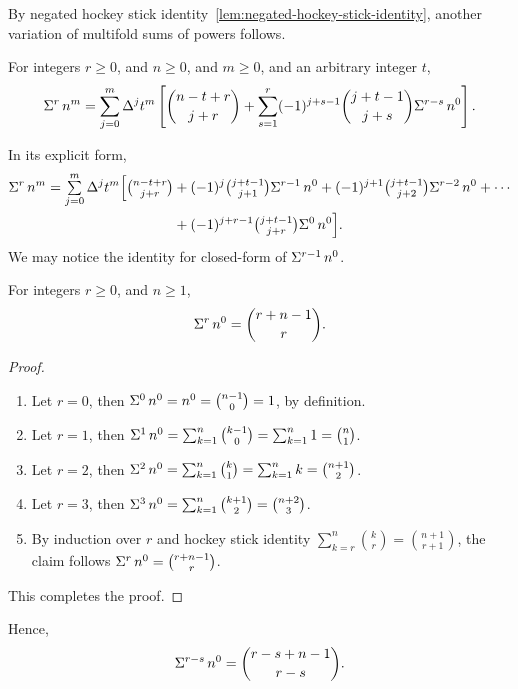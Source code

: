 By negated hockey stick
identity~\eqref{lem:negated-hockey-stick-identity}, another
variation of multifold sums of powers follows.
\begin{theorem}
  \label{theorem:negated-multifold-sums-of-powers-via-newtons-formula}
  For integers $r\geq 0$, and $n\geq 0$, and $m\geq 0$,
  and an arbitrary integer $t$,
  \begin{align*}
    \Sigma^{r}\,{n}^{m}
    = \sum_{j=0}^{m} \Delta^{j} t^{m}
    \left[
      \binom{n-t+r}{j+r}
      + \sum_{s=1}^{r} (-1)^{j+s-1} \binom{j+t-1}{j+s} \Sigma^{r-s}\,{n}^{0}
    \right].
  \end{align*}
\end{theorem}
In its explicit form,
\begin{align*}
  \Sigma^{r}\,{n}^{m} = \mathop{\textstyle\sum}_{j=0}^{m} \Delta^{j} t^{m}
  \Big[
    \tbinom{n-t+r}{j+r}
    &+ (-1)^{j}   \tbinom{j+t-1}{j+1} \Sigma^{r-1}\,{n}^{0}
    + (-1)^{j+1} \tbinom{j+t-1}{j+2} \Sigma^{r-2}\,{n}^{0} + \cdots \\
    &+ (-1)^{j+r-1} \tbinom{j+t-1}{j+r} \Sigma^{0}\,{n}^{0}
  \Big].
\end{align*}
We may notice the identity for closed-form of
$\Sigma^{r-1}\,{n}^{0}$.

\begin{proposition}
  \label{prop:multifold-sum-of-zero-powers}
  For integers $r \geq 0$, and $n\geq 1$,
  \begin{align*}
    \Sigma^{r}\,{n}^{0} = \binom{r+n-1}{r}.
  \end{align*}
  \begin{proof}
    \begin{enumerate}
      \item Let $r=0$, then $\Sigma^{0}\,{n}^{0}=n^0=\binom{n-1}{0} = 1$,
        by definition.
      \item Let $r=1$, then
        $\Sigma^{1}\,{n}^{0}
        = \sum_{k=1}^{n} \binom{k-1}{0}
        = \sum_{k=1}^{n} 1 = \binom{n}{1}$.
      \item Let $r=2$, then
        $\Sigma^{2}\,{n}^{0}= \sum_{k=1}^{n} \binom{k}{1}
        = \sum_{k=1}^{n} k = \binom{n+1}{2}$.
      \item Let $r=3$, then
        $\Sigma^{3}\,{n}^{0}
        = \sum_{k=1}^{n} \binom{k+1}{2}
        = \binom{n+2}{3}$.
      \item By induction over $r$ and hockey stick identity
        $\sum_{k=r}^{n} \binom{k}{r} = \binom{n+1}{r+1}$,
        the claim follows
        $\Sigma^{r}\,{n}^{0} = \binom{r+n-1}{r}$.
    \end{enumerate}
    This completes the proof.
  \end{proof}
\end{proposition}
Hence,
\begin{align*}
  \Sigma^{r-s}\,{n}^{0} = \binom{r-s+n-1}{r-s}.
\end{align*}

